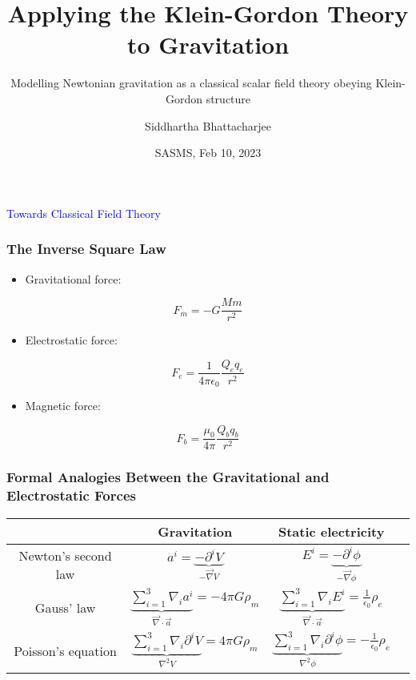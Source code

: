 \documentclass{beamer}
\title{Applying the Klein-Gordon Theory to Gravitation}
\subtitle{Modelling Newtonian gravitation as a classical scalar field theory obeying Klein-Gordon structure}
\author{Siddhartha Bhattacharjee}
\institute
{
1B Mathematical Physics \\
University of Waterloo
}
\date{SASMS, Feb 10, 2023}
\begin{document}
\frame{\titlepage}

\begin{frame}
\begin{center}
\huge \textcolor{blue}{Towards Classical Field Theory}
\end{center}
\end{frame}

\begin{frame}
\frametitle{The Inverse Square Law}

\begin{itemize}
\item Gravitational force:
\end{itemize}

$$F_m = - G \frac{M m}{r^2}$$

\begin{itemize}
\item Electrostatic force:
\end{itemize}

$$F_e = \frac{1}{4 \pi \epsilon_0} \frac{Q_e q_e}{r^2}$$

\begin{itemize}
\item Magnetic force:
\end{itemize}

$$F_b = \frac{\mu_0}{4 \pi} \frac{Q_b q_b}{r^2}$$
\end{frame}

\begin{frame}
\frametitle{Formal Analogies Between the Gravitational and Electrostatic Forces}

\begin{center}
\begin{tabular}{ |c|c|c|c| } 
\hline
& Gravitation & Static electricity \\
\hline
Newton's second law & $a^i = \underset{- \vec{\nabla} V}{\underbrace{- \partial^i V}}$ & $E^i = \underset{- \vec{\nabla} \phi}{\underbrace{- \partial^i \phi}}$ \\
\hline
Gauss' law & $\underset{\vec{\nabla} \cdot \vec{a}}{\underbrace{\sum \limits_{i=1}^3 \nabla_i a^i}} = - 4 \pi G \rho_m$ & $\underset{\vec{\nabla} \cdot \vec{a}}{\underbrace{\sum \limits_{i=1}^3 \nabla_i E^i}} = \frac{1}{\epsilon_0} \rho_e$ \\
\hline
Poisson's equation & $\underset{\nabla^2 V}{\underbrace{\sum \limits_{i=1}^3 \nabla_i \partial^i V}} = 4 \pi G \rho_m$ & $\underset{\nabla^2 \phi}{\underbrace{\sum \limits_{i=1}^3 \nabla_i \partial^i \phi}} = - \frac{1}{\epsilon_0} \rho_e$ \\  
\hline
\end{tabular}
\end{center}
\end{frame}
\end{document}
